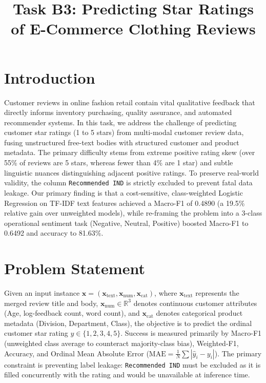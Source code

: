 \documentclass[10pt,conference,a4paper]{IEEEtran}
\title{Task B3: Predicting Star Ratings of E-Commerce Clothing Reviews}
\author{
    \IEEEauthorblockN{Syed Faran Ali \quad|\quad Roll No. 866770 \quad|\quad SAP ID: 70177784 \quad|\quad Section A}
    \IEEEauthorblockA{Department of Intelligent Systems, The University of Lahore}
    \IEEEauthorblockA{Repository: \url{https://github.com/Faran70177784/AI101-ML-Assignment} \quad|\quad Instructor: Dr. Muhammad Awais, AI Architect}
}
\begin{document}
\maketitle

\section{Introduction}
Customer reviews in online fashion retail contain vital qualitative feedback that directly informs inventory purchasing, quality assurance, and automated recommender systems. In this task, we address the challenge of predicting customer star ratings (1 to 5 stars) from multi-modal customer review data, fusing unstructured free-text bodies with structured customer and product metadata. The primary difficulty stems from extreme positive rating skew (over 55\% of reviews are 5 stars, whereas fewer than 4\% are 1 star) and subtle linguistic nuances distinguishing adjacent positive ratings. To preserve real-world validity, the column \texttt{Recommended IND} is strictly excluded to prevent fatal data leakage. Our primary finding is that a cost-sensitive, class-weighted Logistic Regression on TF-IDF text features achieved a Macro-F1 of 0.4890 (a 19.5\% relative gain over unweighted models), while re-framing the problem into a 3-class operational sentiment task (Negative, Neutral, Positive) boosted Macro-F1 to 0.6492 and accuracy to 81.63\%.

\section{Problem Statement}
Given an input instance $\mathbf{x} = (\mathbf{x}_{\text{text}}, \mathbf{x}_{\text{num}}, \mathbf{x}_{\text{cat}})$, where $\mathbf{x}_{\text{text}}$ represents the merged review title and body, $\mathbf{x}_{\text{num}} \in \mathbb{R}^3$ denotes continuous customer attributes (Age, log-feedback count, word count), and $\mathbf{x}_{\text{cat}}$ denotes categorical product metadata (Division, Department, Class), the objective is to predict the ordinal customer star rating $y \in \{1, 2, 3, 4, 5\}$. Success is measured primarily by Macro-F1 (unweighted class average to counteract majority-class bias), Weighted-F1, Accuracy, and Ordinal Mean Absolute Error ($\text{MAE} = \frac{1}{N}\sum |\hat{y}_i - y_i|$). The primary constraint is preventing label leakage: \texttt{Recommended IND} must be excluded as it is filled concurrently with the rating and would be unavailable at inference time.
\end{document}
